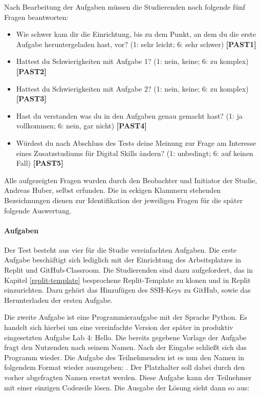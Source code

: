 Nach Bearbeitung der Aufgaben müssen die Studierenden noch folgende fünf
Fragen beantworten:

\begin{itemize}
    \item Wie schwer kam dir die Einrichtung, bis zu dem Punkt, an dem du die
    erste Aufgabe heruntergeladen hast, vor? (1: sehr leicht; 6: sehr schwer)
    \textbf{[PAST1]}
    \item Hattest du Schwierigkeiten mit Aufgabe 1? (1: nein, keine; 6: zu
    komplex) \textbf{[PAST2]}
    \item Hattest du Schwierigkeiten mit Aufgabe 2? (1: nein, keine; 6: zu
    komplex) \textbf{[PAST3]}
    \item Hast du verstanden was du in den Aufgaben genau gemacht hast? (1: ja
    vollkommen; 6: nein, gar nicht) \textbf{[PAST4]}
    \item Würdest du nach Abschluss des Tests deine Meinung zur Frage am
    Interesse eines Zusatzstudiums für Digital Skills ändern? (1: unbedingt;
    6: auf keinen Fall) \textbf{[PAST5]}
\end{itemize}

Alle aufgezeigten Fragen wurden durch den Beobachter und Initiator der Studie,
Andreas Huber, selbst erfunden. Die in eckigen Klammern stehenden Bezeichnungen
dienen zur Identifikation der jeweiligen Fragen für die später folgende
Auswertung.

\paragraph{Aufgaben}
Der Test besteht aus vier für die Studie vereinfachten Aufgaben. Die erste
Aufgabe beschäftigt sich lediglich mit der Einrichtung des Arbeitsplatzes in
Replit und GitHub-Classroom. Die Studierenden sind dazu aufgefordert, das in 
Kapitel \ref{replit-template} besprochene Replit-Template zu klonen und in 
Replit einzurichten. Dazu gehört das Hinzufügen des SSH-Keys zu GitHub, sowie
das Herunterladen der ersten Aufgabe.

Die zweite Aufgabe ist eine Programmieraufgabe mit der Sprache Python. Es
handelt sich hierbei um eine vereinfachte Version der später in produktiv
eingesetzten Aufgabe \glqq Lab 4: Hello\grqq{}. Die bereits gegebene Vorlage der
Aufgabe fragt den Nutzenden nach seinem Namen. Nach der Eingabe schließt sich
das Programm wieder. Die Aufgabe des Teilnehmenden ist es nun den Namen in
folgendem Format wieder auszugeben: . Der
Platzhalter  soll dabei durch den vorher abgefragten Namen ersetzt
werden. Diese Aufgabe kann der Teilnehmer mit einer einzigen Codezeile lösen.
Die Ausgabe der Lösung sieht dann so aus:

